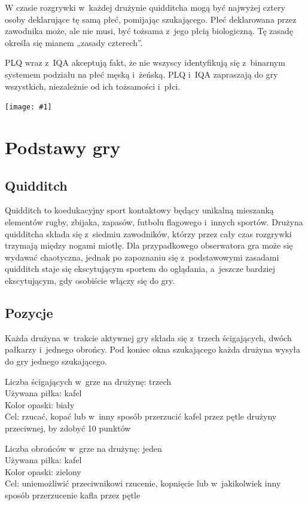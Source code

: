 \documentclass[12pt,a4paper]{article}
\renewcommand{\subsubsection}[1]{
  \oldsubsubsection{#1}%
  \leftskip1.5cm
}
\newcommand\image[2]{
	\newgeometry{left=0cm,top=#2}
	\texttt{[image: \#1]}
	\restoregeometry
}
\begin{document}
W czasie rozgrywki w~każdej drużynie quidditcha mogą być najwyżej cztery
osoby deklarujące tę samą płeć, pomijając szukającego. Płeć deklarowana
przez zawodnika może, ale nie musi, być tożsama z~jego płcią
biologiczną. Tę zasadę określa się mianem „zasady czterech''.

PLQ wraz z~IQA akceptują fakt, że nie wszyscy identyfikują się z~binarnym systemem podziału na płeć męską i~żeńską. PLQ i~IQA zapraszają
do gry wszystkich, niezależnie od ich tożsamości i~płci.

\image{team_poland}{6cm}

\pagebreak
\section{Podstawy gry}

\subsection{Quidditch}

Quidditch to koedukacyjny sport kontaktowy będący unikalną mieszanką
elementów rugby, zbijaka, zapasów, futbolu flagowego i~innych sportów.
Drużyna quidditcha składa się z~siedmiu zawodników, którzy przez cały
czas rozgrywki trzymają między nogami miotłę. Dla przypadkowego
obserwatora gra może się wydawać chaotyczna, jednak po zapoznaniu się z~podstawowymi zasadami quidditch staje się ekscytującym sportem do
oglądania, a~jeszcze bardziej ekscytującym, gdy osobiście włączy się do
gry.

\subsection{Pozycje}
Każda drużyna w~trakcie aktywnej gry składa się z~trzech ścigających,
dwóch pałkarzy i~jednego obrońcy. Pod koniec okna szukającego każda
drużyna wysyła do gry jednego szukającego.

\subsubsection{Ścigający}
Liczba ścigających w~grze na drużynę: trzech \\
Używana piłka: kafel \\
Kolor opaski: biały \\
Cel: rzucać, kopać lub w~inny sposób przerzucić kafel przez pętle
drużyny przeciwnej, by zdobyć 10 punktów

\subsubsection{Obrońcy}
Liczba obrońców w~grze na drużynę: jeden \\
Używana piłka: kafel \\
Kolor opaski: zielony \\
Cel: uniemożliwić przeciwnikowi rzucenie, kopnięcie lub w~jakikolwiek inny sposób przerzucenie kafla przez pętle
\end{document}
